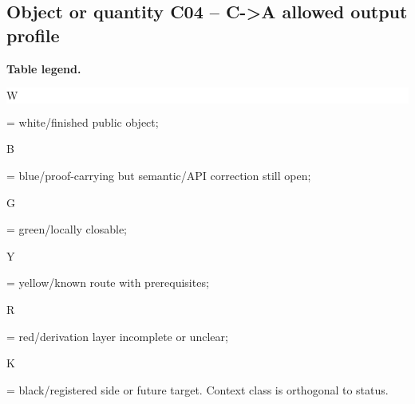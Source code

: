 \subsection*{Object or quantity C04 -- C->A allowed output profile}
\hypertarget{objproof:C04}{}
\par\smallskip\noindent\begin{minipage}{0.99\linewidth}\footnotesize\raggedright\textbf{Table legend.} \colorbox{white}{\strut W} = white/finished public object; \colorbox{cyan!20}{\strut B} = blue/proof-carrying but semantic/API correction still open; \colorbox{green!18}{\strut G} = green/locally closable; \colorbox{yellow!25}{\strut Y} = yellow/known route with prerequisites; \colorbox{red!20}{\strut R} = red/derivation layer incomplete or unclear; \colorbox{black!18}{\strut K} = black/registered side or future target. Context class is orthogonal to status.\end{minipage}\par\vspace{0.25em}
